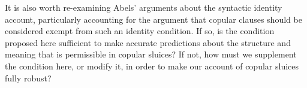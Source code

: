 \documentclass{turabian-researchpaper}
\begin{document}
It is also worth re-examining Abels' arguments about the syntactic identity account, particularly accounting for the argument that copular clauses should be considered exempt from such an identity condition. If so, is the condition proposed here sufficient to make accurate predictions about the structure and meaning that is permissible in copular sluices? If not, how must we supplement the condition here, or modify it, in order to make our account of copular sluices fully robust?  











\clearpage
 
\end{document}
